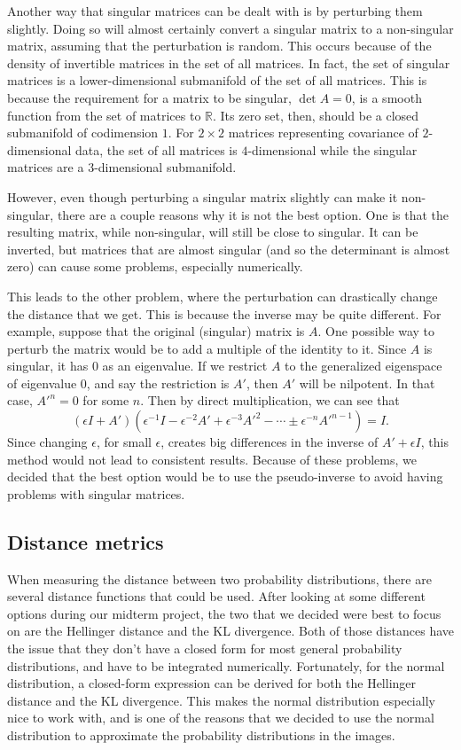 \documentclass{article}
\begin{document}
Another way that singular matrices can be dealt with is by perturbing them
slightly. Doing so will almost certainly convert a singular matrix to a
non-singular matrix, assuming that the perturbation is random. This occurs
because of the density of invertible matrices in the set of all matrices. In
fact, the set of singular matrices is a lower-dimensional submanifold of the
set of all matrices. This is because the requirement for a matrix to be
singular, $\det A=0$, is a smooth function from the set of matrices to $\mathbb
R$. Its zero set, then, should be a closed submanifold of codimension $1$. For
$2\times 2$ matrices representing covariance of $2$-dimensional data, the set
of all matrices is $4$-dimensional while the singular matrices are a
$3$-dimensional submanifold.

However, even though perturbing a singular matrix slightly can make it
non-singular, there are a couple reasons why it is not the best option. One is
that the resulting matrix, while non-singular, will still be close to singular.
It can be inverted, but matrices that are almost singular (and so the
determinant is almost zero) can cause some problems, especially numerically.

This leads to the other problem, where the perturbation can drastically change
the distance that we get. This is because the inverse may be quite different.
For example, suppose that the original (singular) matrix is $A$. One possible
way to perturb the matrix would be to add a multiple of the identity to it.
Since $A$ is singular, it has $0$ as an eigenvalue. If we restrict $A$ to the
generalized eigenspace of eigenvalue $0$, and say the restriction is $A'$, then
$A'$ will be nilpotent. In that case, $A'^n=0$ for some $n$. Then by direct
multiplication, we can see that
\[
    (\epsilon I+A')(\epsilon^{-1}I-\epsilon^{-2}A'+\epsilon^{-3}A'^2-\cdots
    \pm\epsilon^{-n}A'^{n-1})=I.
\]
Since changing $\epsilon$, for small $\epsilon$, creates big differences in the
inverse of $A'+\epsilon I$, this method would not lead to consistent results.
Because of these problems, we decided that the best option would be to use the
pseudo-inverse to avoid having problems with singular matrices.

\subsection{Distance metrics}

When measuring the distance between two probability distributions, there are
several distance functions that could be used. After looking at some different
options during our midterm project, the two that we decided were best to focus
on are the Hellinger distance and the KL divergence. Both of those distances
have the issue that they don't have a closed form for most general probability
distributions, and have to be integrated numerically. Fortunately, for the
normal distribution, a closed-form expression can be derived for both the
Hellinger distance and the KL divergence. This makes the normal distribution
especially nice to work with, and is one of the reasons that we decided to use
the normal distribution to approximate the probability distributions in the
images.
\end{document}
